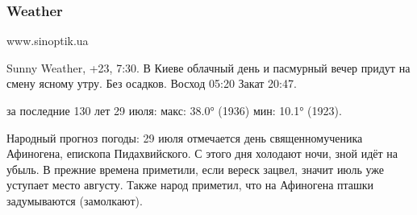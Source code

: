  

\subsubsection{Weather}


www.sinoptik.ua

Sunny Weather, +23, 7:30. В Киеве облачный день и пасмурный вечер придут на
смену ясному утру. Без осадков. Восход 05:20 Закат 20:47.

за последние 130 лет 29 июля: макс: 38.0° (1936) мин: 10.1° (1923).

Народный прогноз погоды: 29 июля отмечается день священномученика Афиногена,
епископа Пидахвийского. С этого дня холодают ночи, зной идёт на убыль. В
прежние времена приметили, если вереск зацвел, значит июль уже уступает место
августу. Также народ приметил, что на Афиногена пташки задумываются
(замолкают).

 
